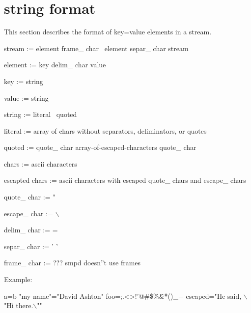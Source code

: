 \documentclass{article}
\begin{document}
\section{string format}
This section describes the format of key=value elements in a stream.

stream := element frame\_ char \vline\ element separ\_ char stream

element := key delim\_ char value

key := string

value := string

string := literal \vline\ quoted

literal := array of chars without separators, deliminators, or quotes

quoted := quote\_ char array-of-escaped-characters quote\_ char

chars := ascii characters

escapted chars := ascii characters with escaped quote\_ chars and escape\_ chars

quote\_ char := "

escape\_ char := $\backslash$

delim\_ char := =

separ\_ char := ' '

frame\_ char := ??? smpd doesn''t use frames

Example:

	a=b "my name"="David Ashton" foo=;.<>!'@\#\$\%\^\&*()\_+ escaped="He said, $\backslash$"Hi there.$\backslash$""
	
\end{document}
